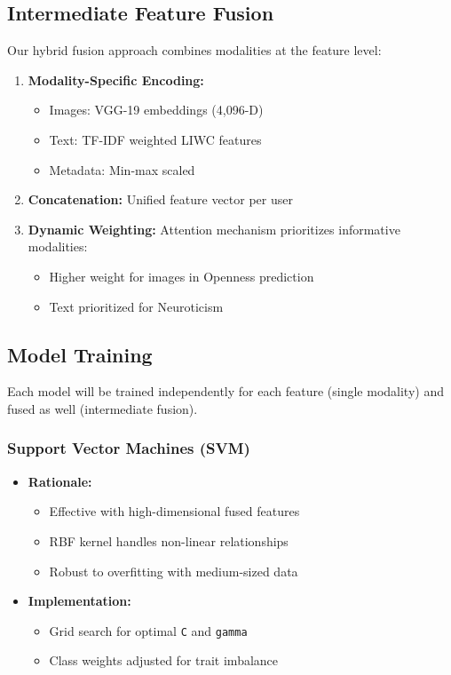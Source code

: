 \subsection{Intermediate Feature Fusion}
\label{subsec:fusion}

Our hybrid fusion approach combines modalities at the feature level:

\begin{enumerate}
	\item \textbf{Modality-Specific Encoding:}
	\begin{itemize}
		\item Images: VGG-19 embeddings (4,096-D)
		\item Text: TF-IDF weighted LIWC features
		\item Metadata: Min-max scaled
	\end{itemize}
	
	\item \textbf{Concatenation:} Unified feature vector per user
	
	\item \textbf{Dynamic Weighting:} Attention mechanism prioritizes informative modalities:
	\begin{itemize}
		\item Higher weight for images in Openness prediction
		\item Text prioritized for Neuroticism
	\end{itemize}
\end{enumerate}

\subsection{Model Training}
\label{subsec:models}
Each model will be trained independently for each feature (single modality) and fused as well (intermediate fusion).

\subsubsection{Support Vector Machines (SVM)}
\label{subsubsec:svm}

\begin{itemize}
	\item \textbf{Rationale:}
	\begin{itemize}
		\item Effective with high-dimensional fused features \cite{farnadi2018}
		\item RBF kernel handles non-linear relationships
		\item Robust to overfitting with medium-sized data
	\end{itemize}
	
	\item \textbf{Implementation:}
	\begin{itemize}
		\item Grid search for optimal \texttt{C} and \texttt{gamma}
		\item Class weights adjusted for trait imbalance
	\end{itemize}
\end{itemize}

